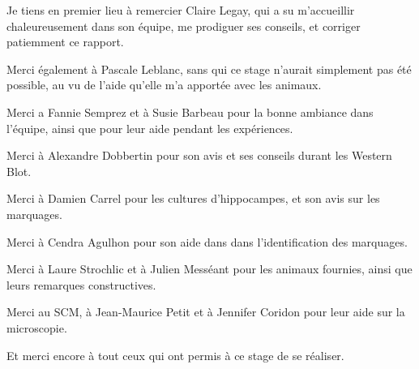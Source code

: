 Je tiens en premier lieu à remercier Claire Legay, qui a su m'accueillir chaleureusement dans son équipe, me prodiguer ses conseils, et corriger patiemment ce rapport.

{\setlength{\parindent}{0cm}
Merci également à Pascale Leblanc, sans qui ce stage n'aurait simplement pas été possible, au vu de l'aide qu'elle m'a apportée avec les animaux.

Merci a Fannie Semprez et à Susie Barbeau pour la bonne ambiance dans l'équipe, ainsi que pour leur aide pendant les expériences.

Merci à Alexandre Dobbertin pour son avis et ses conseils durant les Western Blot.

Merci à Damien Carrel pour les cultures d'hippocampes, et son avis sur les marquages.

Merci à Cendra Agulhon pour son aide dans dans l'identification des marquages.

Merci à Laure Strochlic et à Julien Messéant pour les animaux fournies, ainsi que leurs remarques constructives.

Merci au SCM, à Jean-Maurice Petit et à Jennifer Coridon pour leur aide sur la microscopie.

Et merci encore à tout ceux qui ont permis à ce stage de se réaliser.}
